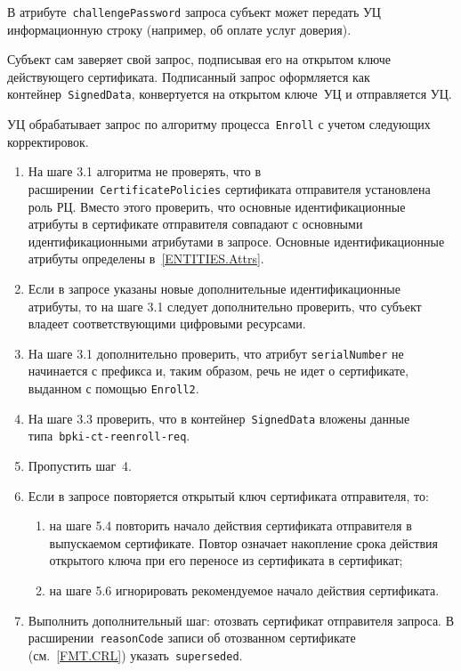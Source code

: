 В атрибуте~\texttt{challengePassword} запроса субъект может передать УЦ 
информационную строку (например, об оплате услуг доверия).

Субъект сам заверяет свой запрос, подписывая его на открытом ключе 
действующего сертификата. Подписанный запрос оформляется как 
контейнер~\texttt{SignedData}, конвертуется на открытом ключе~УЦ
и отправляется УЦ.

УЦ обрабатывает запрос по алгоритму процесса~\texttt{Enroll}
с учетом следующих корректировок.
\begin{enumerate}
\item
На шаге 3.1 алгоритма не проверять, что в
расширении~\texttt{CertificatePolicies} сертификата отправителя установлена
роль РЦ. Вместо этого проверить, что основные идентификационные атрибуты
в сертификате отправителя совпадают с основными идентификационными
атрибутами в запросе. Основные идентификационные атрибуты определены
в~\ref{ENTITIES.Attrs}.

\item
Если в запросе указаны новые дополнительные идентификационные атрибуты,
то на шаге 3.1 следует дополнительно проверить, что субъект 
владеет соответствующими цифровыми ресурсами. 

\item
На шаге 3.1 дополнительно проверить, что атрибут \texttt{serialNumber}
не начинается с префикса  и, таким образом,
речь не идет о сертификате, выданном с помощью \texttt{Enroll2}.
 
\item
На шаге 3.3 проверить, что в контейнер~\texttt{SignedData} вложены данные 
типа~\texttt{bpki-ct-reenroll-req}. 

\item
Пропустить шаг~4.

\item
Если в запросе повторяется открытый ключ сертификата отправителя, то:
\begin{enumerate}
\item
на шаге 5.4 повторить начало действия сертификата отправителя в выпускаемом 
сертификате. Повтор означает накопление срока действия открытого ключа 
при его переносе из сертификата в сертификат; 

%

\item
на шаге 5.6 игнорировать рекомендуемое начало действия сертификата.
\end{enumerate}

\item
Выполнить дополнительный шаг: отозвать сертификат отправителя запроса.
%
В расширении~\texttt{reasonCode} записи об отозванном сертификате 
(см.~\ref{FMT.CRL}) указать~\texttt{superseded}.
\end{enumerate}

